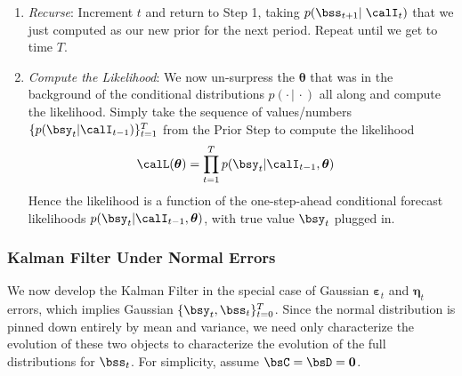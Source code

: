\documentclass[12pt]{article}
\theoremstyle{plain}
\theoremstyle{definition}
\theoremstyle{remark}
\newcommand{\bseta}{\boldsymbol{\eta}}
\newcommand{\bstheta}{\boldsymbol{\theta}}
\newcommand{\bsvarepsilon}{\boldsymbol{\varepsilon}}
\renewcommand{\bso}{\boldsymbol{0}}
\newcommand{\prodtT}{\prod^T_{t=1}}
\newcommand{\tT}{_{t=1}^T}
\begin{document}
\begin{enumerate}
  \item \emph{Recurse}:
    Increment $t$ and return to Step 1, taking
    $p(\bss_{t+1}|\;\calI_{t})$ that we just computed as our new prior
    for the next period. Repeat until we get to time $T$.

  \item \emph{Compute the Likelihood}:
    We now un-surpress the $\bstheta$ that was in the background of the
    conditional distributions $p(\cdot\,|\,\cdot)$ all along and compute
    the likelihood.
    Simply take the sequence of values/numbers
    $\{p(\bsy_t|\calI_{t-1})\}\tT$ from the Prior Step to compute the
    likelihood
    \begin{align*}
      \calL(\bstheta)
      &= \prodtT p(\bsy_t|\calI_{t-1},\bstheta)
    \end{align*}
    Hence the likelihood is a function of the one-step-ahead conditional
    forecast likelihoods $p(\bsy_t|\calI_{t-1},\bstheta)$, with true
    value $\bsy_t$ plugged in.
\end{enumerate}

\clearpage

\subsubsection{Kalman Filter Under Normal Errors}
\label{subsec:kfnormal}

We now develop the Kalman Filter in the special case of
Gaussian $\bsvarepsilon_t$ and $\bseta_t$ errors, which implies
Gaussian $\{\bsy_t,\bss_t\}_{t=0}^T$.
Since the normal distribution is pinned down entirely by mean and
variance, we need only characterize the evolution of these two objects
to characterize the evolution of the full distributions for $\bss_t$.
For simplicity, assume $\bsC=\bsD=\bso$.
\end{document}
